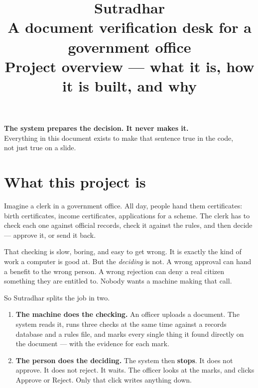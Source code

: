 \documentclass[11pt,a4paper]{article}
\title{\vspace{-1.5cm}\Huge\textbf{Sutradhar}\\[6pt]
  \large A document verification desk for a government office\\[10pt]
  \normalsize\textnormal{Project overview --- what it is, how it is built, and why}}
\author{}
\date{}
\begin{document}
\maketitle
\thispagestyle{empty}

\vspace{-1cm}

\begin{center}
\colorbox{shade}{\parbox{0.9\linewidth}{\vspace{4pt}\centering
\textbf{\large The system prepares the decision. It never makes it.}\\[4pt]
\small Everything in this document exists to make that sentence true in the code,\\
not just true on a slide.\vspace{4pt}}}
\end{center}

\vspace{0.8cm}

\tableofcontents

\newpage

\section{What this project is}

Imagine a clerk in a government office. All day, people hand them certificates:
birth certificates, income certificates, applications for a scheme. The clerk
has to check each one against official records, check it against the rules, and
then decide --- approve it, or send it back.

That checking is slow, boring, and easy to get wrong. It is exactly the kind of
work a computer is good at. But the \emph{deciding} is not. A wrong approval can
hand a benefit to the wrong person. A wrong rejection can deny a real citizen
something they are entitled to. Nobody wants a machine making that call.

So Sutradhar splits the job in two.

\begin{enumerate}
  \item \textbf{The machine does the checking.} An officer uploads a document.
        The system reads it, runs three checks at the same time against a
        records database and a rules file, and marks every single thing it found
        directly on the document --- with the evidence for each mark.
  \item \textbf{The person does the deciding.} The system then \textbf{stops}.
        It does not approve. It does not reject. It waits. The officer looks at
        the marks, and clicks Approve or Reject. Only that click writes anything
        down.
\end{enumerate}
\end{document}
